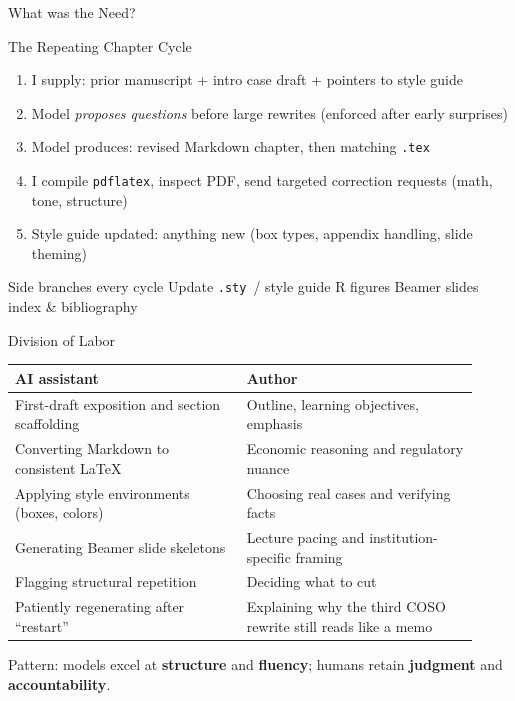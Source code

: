 \documentclass[11pt, aspectratio=169]{beamer}
\begin{document}
\begin{frame}{What was the Need?}
\begin{frame}{The Repeating Chapter Cycle}
\begin{enumerate}
  \item I supply: prior manuscript + intro case draft + pointers to style guide
  \item Model \emph{proposes questions} before large rewrites (enforced after early surprises)
  \item Model produces: revised Markdown chapter, then matching \texttt{.tex}
  \item I compile \texttt{pdflatex}, inspect PDF, send targeted correction requests
        (math, tone, structure)
  \item Style guide updated: anything new (box types, appendix handling, slide theming)
\end{enumerate}
\medskip
\begin{block}{Side branches every cycle}
Update \texttt{.sty}~/ style guide \quad R figures \quad Beamer slides \quad index \& bibliography
\end{block}
\end{frame}

\begin{frame}{Division of Labor}
\begin{center}
\small
\begin{tabular}{@{}p{0.46\linewidth} p{0.46\linewidth}@{}}
\toprule
\textbf{AI assistant} & \textbf{Author} \\
\midrule
First-draft exposition and section scaffolding & Outline, learning objectives, emphasis \\[4pt]
Converting Markdown to consistent \LaTeX{} & Economic reasoning and regulatory nuance \\[4pt]
Applying style environments (boxes, colors) & Choosing real cases and verifying facts \\[4pt]
Generating Beamer slide skeletons & Lecture pacing and institution-specific framing \\[4pt]
Flagging structural repetition & Deciding what to cut \\[4pt]
Patiently regenerating after ``restart'' & Explaining why the third COSO rewrite still reads like a memo \\
\bottomrule
\end{tabular}
\end{center}
\medskip
Pattern: models excel at \textbf{structure} and \textbf{fluency};
humans retain \textbf{judgment} and \textbf{accountability}.
\end{frame}


\end{frame}
\end{document}
